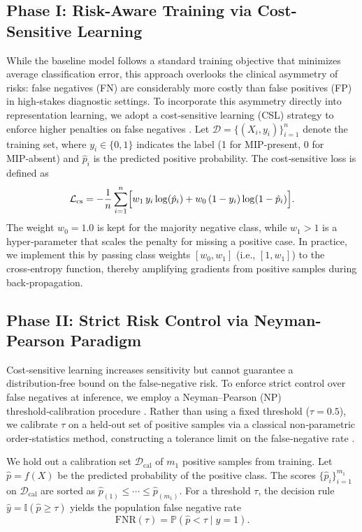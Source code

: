 \documentclass[journal,twoside,web]{ieeecolor}
\begin{document}
\subsection{Phase I: Risk-Aware Training via Cost-Sensitive Learning}\label{sec:phase1_method}

While the baseline model follows a standard training objective that minimizes average classification error, this approach overlooks the clinical asymmetry of risks: false negatives (FN) are considerably more costly than false positives (FP) in high‑stakes diagnostic settings. To incorporate this asymmetry directly into representation learning, we adopt a cost‑sensitive learning (CSL) strategy to enforce higher penalties on false negatives \cite{he2009learning}.  Let \(\mathcal{D} = \{(X_i, y_i)\}_{i=1}^{n}\) denote the training set, where \(y_i \in \{0,1\}\) indicates the label (1 for MIP‑present, 0 for MIP‑absent) and \(\hat{p}_i\) is the predicted positive probability. The cost‑sensitive loss is defined as  
\begin{equation*}
    \mathcal{L}_{\mathrm{cs}} = - \frac{1}{n} \sum_{i=1}^{n} \Bigl[ w_{1} \, y_i \log(\hat{p}_i) + w_{0} \, (1-y_i) \log(1-\hat{p}_i) \Bigr].
\end{equation*}
The weight \(w_{0}=1.0\) is kept for the majority negative class, while \(w_{1} > 1\) is a hyper‑parameter that scales the penalty for missing a positive case.  
In practice, we implement this by passing class weights \([w_{0}, w_{1}]\) (i.e., \([1, w_{1}]\)) to the cross‑entropy function, thereby amplifying gradients from positive samples during back‑propagation.


\subsection{Phase II: Strict Risk Control via Neyman-Pearson Paradigm}
\label{sec:phase2_method}

Cost‑sensitive learning increases sensitivity but cannot guarantee a distribution‑free bound on the false‑negative risk. To enforce strict control over false negatives at inference, we employ a Neyman–Pearson (NP) threshold‑calibration procedure \cite{rigollet2011neyman,tong2018neyman}. Rather than using a fixed threshold (\(\tau = 0.5\)), we calibrate \(\tau\) on a held‑out set of positive samples via a classical non‑parametric order‑statistics method, constructing a tolerance limit on the false‑negative rate \cite{wilks1941determination}.

We hold out a calibration set $\mathcal{D}_{\mathrm{cal}}$ of $m_1$ positive samples from training. Let $\hat{p} = f(X)$ be the predicted probability of the positive class. The scores $\{\hat{p}_i\}_{i=1}^{m_1}$ on $\mathcal{D}_{\mathrm{cal}}$ are sorted as $\hat{p}_{(1)} \le \cdots \le \hat{p}_{(m_1)}$. For a threshold $\tau$, the decision rule $\hat{y} = \mathbb{I}(\hat{p} \ge \tau)$ yields the population false negative rate
\[
\mathrm{FNR}(\tau) = \mathbb{P}(\hat{p} < \tau \mid y = 1).
\]
\end{document}
